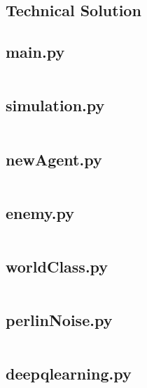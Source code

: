 \begin{flushleft}
    \huge
    \section{Technical Solution}
    \vspace{0.1cm}

    \subsection{main.py}
    \inputminted[frame=leftline,framesep=2mm,baselinestretch=1.2,fontsize=\small,linenos]{python}{../Scripts/main.py}

    \subsection{simulation.py}
    \inputminted[frame=leftline,framesep=2mm,baselinestretch=1.2,fontsize=\small,linenos]{python}{../Scripts/simulation.py}

    \subsection{newAgent.py}
    \inputminted[frame=leftline,framesep=2mm,baselinestretch=1.2,fontsize=\small,linenos]{python}{../Scripts/newAgent.py}

    \subsection{enemy.py}
    \inputminted[frame=leftline,framesep=2mm,baselinestretch=1.2,fontsize=\small,linenos]{python}{../Scripts/enemy.py}

    \subsection{worldClass.py}
    \inputminted[frame=leftline,framesep=2mm,baselinestretch=1.2,fontsize=\small,linenos]{python}{../Scripts/worldClass.py}

    \subsection{perlinNoise.py}
    \inputminted[frame=leftline,framesep=2mm,baselinestretch=1.2,fontsize=\small,linenos]{python}{../Scripts/perlinNoise.py}

    \subsection{deepqlearning.py}
    \inputminted[frame=leftline,framesep=2mm,baselinestretch=1.2,fontsize=\small,linenos]{python}{../Scripts/deepqlearning.py}


\end{flushleft}
